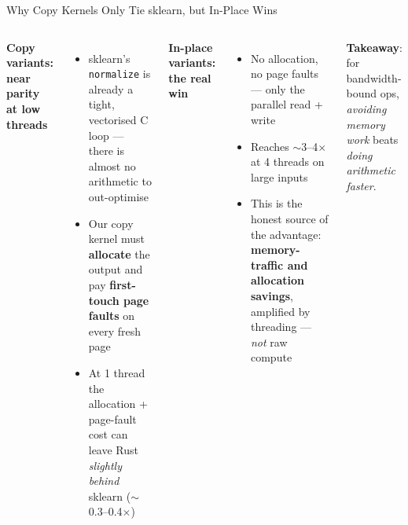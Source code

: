 \documentclass[aspectratio=169]{beamer}
\begin{document}
\begin{frame}{Why Copy Kernels Only Tie sklearn, but In-Place Wins}
  \begin{columns}[T]
    \textbf{Copy variants: near parity at low threads}
    \begin{itemize}
      \item sklearn's \texttt{normalize} is already a tight, vectorised C loop ---
            there is almost no arithmetic to out-optimise
      \item Our copy kernel must \textbf{allocate} the output and pay
            \textbf{first-touch page faults} on every fresh page
      \item At 1 thread the allocation + page-fault cost can leave Rust
            \emph{slightly behind} sklearn ($\sim$0.3--0.4$\times$)
    \end{itemize}
    \textbf{In-place variants: the real win}
    \begin{itemize}
      \item No allocation, no page faults --- only the parallel read + write
      \item Reaches $\sim$3--4$\times$ at 4 threads on large inputs
      \item This is the honest source of the advantage: \textbf{memory-traffic and
            allocation savings}, amplified by threading --- \emph{not} raw compute
    \end{itemize}
    \vspace{0.3em}
    \textbf{Takeaway}: for bandwidth-bound ops, \emph{avoiding memory work} beats
    \emph{doing arithmetic faster}.
  \end{columns}
\end{frame}
\end{document}
